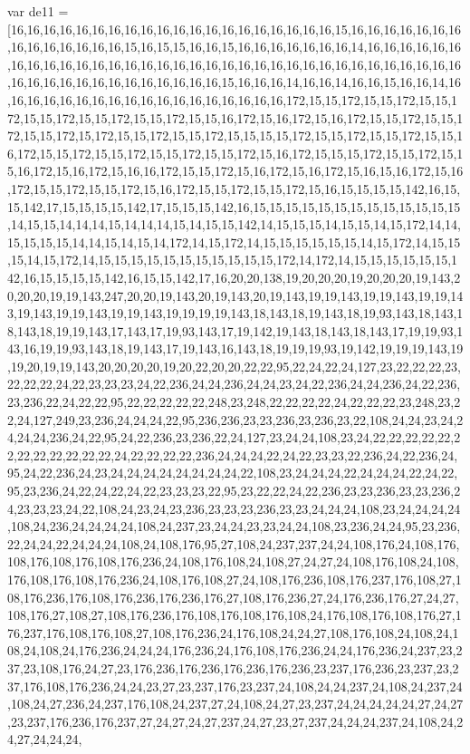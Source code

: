 var de11 = [16,16,16,16,16,16,16,16,16,16,16,16,16,16,16,16,16,16,16,16,15,16,16,16,16,16,16,16,16,16,16,16,16,16,16,15,16,15,15,16,16,15,16,16,16,16,16,16,16,14,16,16,16,16,16,16,16,16,16,16,16,16,16,16,16,16,16,16,16,16,16,16,16,16,16,16,16,16,16,16,16,16,16,16,16,16,16,16,16,16,16,16,16,16,16,16,16,15,16,16,16,14,16,16,14,16,16,15,16,16,14,16,16,16,16,16,16,16,16,16,16,16,16,16,16,16,16,16,16,172,15,15,172,15,15,172,15,15,172,15,15,172,15,15,172,15,15,172,15,15,16,172,15,16,172,15,16,172,15,15,172,15,15,172,15,15,172,15,172,15,15,172,15,15,172,15,15,15,15,172,15,15,172,15,15,172,15,15,16,172,15,15,172,15,15,172,15,15,172,15,15,172,15,16,172,15,15,15,172,15,15,172,15,15,16,172,15,16,172,15,16,16,172,15,15,172,15,16,172,15,16,172,15,16,15,16,172,15,16,172,15,15,172,15,15,172,15,16,172,15,15,172,15,15,172,15,16,15,15,15,15,142,16,15,15,142,17,15,15,15,15,142,17,15,15,15,142,16,15,15,15,15,15,15,15,15,15,15,15,15,15,14,15,15,14,14,14,15,14,14,14,15,14,15,15,142,14,15,15,15,14,15,15,14,15,172,14,14,15,15,15,15,14,14,15,14,15,14,172,14,15,172,14,15,15,15,15,15,15,14,15,172,14,15,15,15,14,15,172,14,15,15,15,15,15,15,15,15,15,15,15,172,14,172,14,15,15,15,15,15,15,142,16,15,15,15,15,142,16,15,15,142,17,16,20,20,138,19,20,20,20,19,20,20,20,19,143,20,20,20,19,19,143,247,20,20,19,143,20,19,143,20,19,143,19,19,143,19,19,143,19,19,143,19,143,19,19,143,19,19,143,19,19,19,19,143,18,143,18,19,143,18,19,93,143,18,143,18,143,18,19,19,143,17,143,17,19,93,143,17,19,142,19,143,18,143,18,143,17,19,19,93,143,16,19,19,93,143,18,19,143,17,19,143,16,143,18,19,19,19,93,19,142,19,19,19,143,19,19,20,19,19,143,20,20,20,20,19,20,22,20,20,22,22,95,22,24,22,24,127,23,22,22,22,23,22,22,22,24,22,23,23,23,24,22,236,24,24,236,24,24,23,24,22,236,24,24,236,24,22,236,23,236,22,24,22,22,95,22,22,22,22,22,248,23,248,22,22,22,22,24,22,22,22,23,248,23,22,24,127,249,23,236,24,24,24,22,95,236,236,23,23,236,23,236,23,22,108,24,24,23,24,24,24,24,236,24,22,95,24,22,236,23,236,22,24,127,23,24,24,108,23,24,22,22,22,22,22,22,22,22,22,22,22,22,24,22,22,22,22,236,24,24,24,22,24,22,23,23,22,236,24,22,236,24,95,24,22,236,24,23,24,24,24,24,24,24,24,24,22,108,23,24,24,24,22,24,24,24,22,24,22,95,23,236,24,22,24,22,24,22,23,23,23,22,95,23,22,22,24,22,236,23,23,236,23,23,236,24,23,23,23,24,22,108,24,23,24,23,236,23,23,23,236,23,23,24,24,24,108,23,24,24,24,24,108,24,236,24,24,24,24,108,24,237,23,24,24,23,23,24,24,108,23,236,24,24,95,23,236,22,24,24,22,24,24,24,108,24,108,176,95,27,108,24,237,237,24,24,108,176,24,108,176,108,176,108,176,108,176,236,24,108,176,108,24,108,27,24,27,24,108,176,108,24,108,176,108,176,108,176,236,24,108,176,108,27,24,108,176,236,108,176,237,176,108,27,108,176,236,176,108,176,236,176,236,176,27,108,176,236,27,24,176,236,176,27,24,27,108,176,27,108,27,108,176,236,176,108,176,108,176,108,24,176,108,176,108,176,27,176,237,176,108,176,108,27,108,176,236,24,176,108,24,24,27,108,176,108,24,108,24,108,24,108,24,176,236,24,24,24,176,236,24,176,108,176,236,24,24,176,236,24,237,23,237,23,108,176,24,27,23,176,236,176,236,176,236,176,236,23,237,176,236,23,237,23,237,176,108,176,236,24,24,23,27,23,237,176,23,237,24,108,24,24,237,24,108,24,237,24,108,24,27,236,24,237,176,108,24,237,27,24,108,24,27,23,237,24,24,24,24,24,27,24,27,23,237,176,236,176,237,27,24,27,24,27,237,24,27,23,27,237,24,24,24,237,24,108,24,24,27,24,24,24,